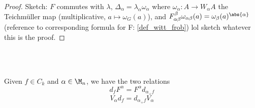 \begin{proof}
Sketch: $F$ commutes with $\lambda$, $\Delta_\alpha = \lambda_\alpha \omega_\alpha$ where $\omega_\alpha: A \to W_\alpha A$ the Teichm\"uller map (multiplicative, $a \mapsto \omega_G(a)$), and $F_{\alpha\beta}^\beta \omega_{\alpha\beta}(a) = \omega_\beta(a)^{\abs{\alpha}}$ (reference to corresponding formula for F: \ref{def_witt_frob}) lol sketch whatever this is the proof.
\end{proof}
%
%
\\
\\
\begin{lem}\label{lem_rel_V_d_F_d}
Given $f \in C_k$ and $\alpha \in \M_n$, we have the two relations
	\[ d_f F^\alpha = F^\alpha d_{\alpha_+ f} \]
	\[ V_\alpha d_f = d_{\alpha_+ f} V_\alpha \]
\end{lem}
%
%
